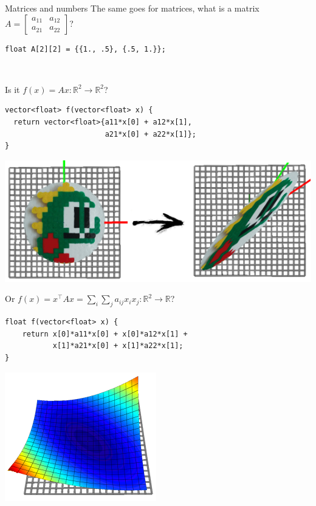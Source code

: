 \documentclass[UKenglish,aspectratio=169]{beamer}
\begin{document}
\begin{frame}[fragile]{Matrices and numbers}
The same goes for matrices, what is a matrix $A=\begin{bmatrix} a_{11} & a_{12} \\ a_{21} & a_{22}\end{bmatrix}$?
\pause
\begin{verbatim}
float A[2][2] = {{1., .5}, {.5, 1.}};
\end{verbatim}

\pause
~\\
\begin{minipage}{.7\linewidth}
Is it $f(x) = Ax : \mathbb R^2 \rightarrow \mathbb R^2$?
\begin{verbatim}
vector<float> f(vector<float> x) {
  return vector<float>{a11*x[0] + a12*x[1],
                       a21*x[0] + a22*x[1]};
}
\end{verbatim}
\end{minipage}
\begin{minipage}{.28\linewidth}
\includegraphics[width=\linewidth]{../manuscript/img/matrix-linear.png}
\end{minipage}

\pause
\begin{minipage}{.7\linewidth}
\vspace{2ex}
Or $f(x)= x^\top A x = \sum\limits_i\sum\limits_j a_{ij}x_i x_j  : \mathbb R^2 \rightarrow \mathbb R$?
\begin{verbatim}
float f(vector<float> x) {
    return x[0]*a11*x[0] + x[0]*a12*x[1] +
           x[1]*a21*x[0] + x[1]*a22*x[1];
}
\end{verbatim}
\end{minipage}
\begin{minipage}{.28\linewidth}
\centering\includegraphics[width=.7\linewidth]{../manuscript/img/matrix-quadratic-form.png}
\end{minipage}
\end{frame}
\end{document}
